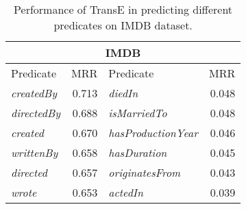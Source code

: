 \begin{table}[thb]
\scriptsize
\centering
\begin{tabular}{|l|r|l|r|} 
 \hline
 \multicolumn{4}{|c|}{IMDB} \\
 \hline
 Predicate & MRR & Predicate & MRR  \\
 \hline
\textit{createdBy} & 0.713 & \textit{diedIn} & 0.048 \\
\textit{directedBy} & 0.688 & \textit{isMarriedTo} & 0.048 \\
\textit{created} & 0.670 & \textit{hasProductionYear} & 0.046 \\
\textit{writtenBy} & 0.658 & \textit{hasDuration} & 0.045 \\
\textit{directed} & 0.657 & \textit{originatesFrom} & 0.043 \\
\textit{wrote} & 0.653 & \textit{actedIn} & 0.039 \\
 \hline
\end{tabular}
\newline
\caption{Performance of TransE in predicting different predicates on IMDB dataset.}
\label{table:imdb_predicate_mrr}
\end{table}